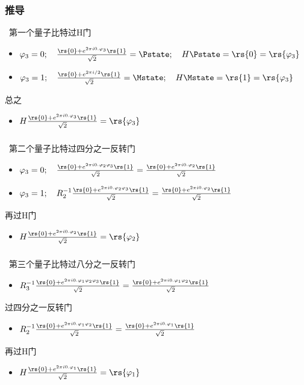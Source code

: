 \begin{frame}
    \frametitle{推导}
    {\Bullet}~第一个量子比特过H门
    \begin{itemize}
        \item $\varphi_3=0; \quad \frac{\rs{0}+e^{2\pi i 0.\varphi_3}\rs{1}}{\sqrt{2}} = \Pstate; \quad H\Pstate = \rs{0} =\rs{\varphi_3} $
        \item $\varphi_3=1; \quad \frac{\rs{0}+e^{2\pi i /2 }\rs{1}}{\sqrt{2}} = \Mstate; \quad H\Mstate = \rs{1} =\rs{\varphi_3} $
    \end{itemize}
    总之
    \begin{itemize}
        \item $ H \frac{\rs{0}+e^{2\pi i 0.\varphi_3}\rs{1}}{\sqrt{2}} = \rs{\varphi_3}$
    \end{itemize}
\end{frame}

\begin{frame}
    \frametitle{}
    {\Bullet}~第二个量子比特过四分之一反转门
    \begin{itemize}
        \item $\varphi_3=0; \quad \frac{\rs{0}+e^{2\pi i 0.\varphi_2\varphi_3}\rs{1}}{\sqrt{2}} =  \frac{\rs{0}+e^{2\pi i 0.\varphi_2}\rs{1}}{\sqrt{2}} $
        \item $\varphi_3=1; \quad R_2 ^{-1} \frac{\rs{0}+e^{2\pi i 0.\varphi_2\varphi_3}\rs{1}}{\sqrt{2}} =  \frac{\rs{0}+e^{2\pi i 0.\varphi_2}\rs{1}}{\sqrt{2}} $
    \end{itemize}
    再过H门 
    \begin{itemize}
        \item $ H \frac{\rs{0}+e^{2\pi i 0.\varphi_2}\rs{1}}{\sqrt{2}} = \rs{\varphi_2}$
    \end{itemize}
\end{frame}

\begin{frame}
    \frametitle{}
    {\Bullet}~第三个量子比特过八分之一反转门
    \begin{itemize}
        \item $ R_3 ^{-1} \frac{\rs{0}+e^{2\pi i 0.\varphi_1\varphi_2\varphi_3}\rs{1}}{\sqrt{2}} =  \frac{\rs{0}+e^{2\pi i 0.\varphi_1\varphi_2}\rs{1}}{\sqrt{2}} $
    \end{itemize}
    过四分之一反转门
    \begin{itemize}
        \item $ R_2 ^{-1} \frac{\rs{0}+e^{2\pi i 0.\varphi_1\varphi_2}\rs{1}}{\sqrt{2}} =  \frac{\rs{0}+e^{2\pi i 0.\varphi_1}\rs{1}}{\sqrt{2}} $
    \end{itemize}
    再过H门 
    \begin{itemize}
        \item $ H \frac{\rs{0}+e^{2\pi i 0.\varphi_1}\rs{1}}{\sqrt{2}} = \rs{\varphi_1}$
    \end{itemize}
\end{frame}

